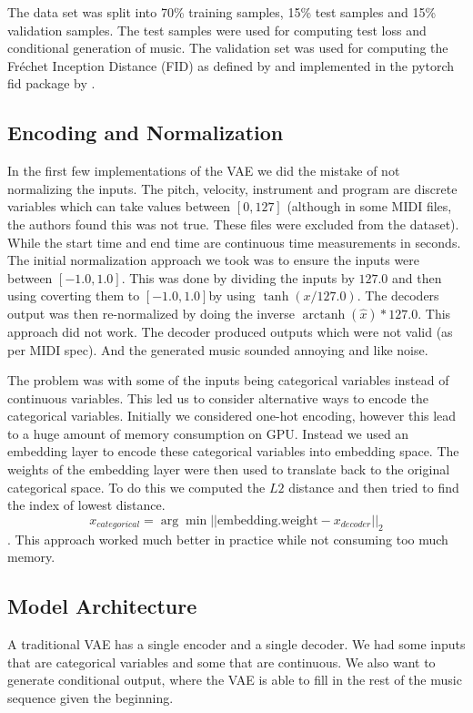 \documentclass{article}
\DeclareMathOperator\arctanh{arctanh}
\begin{document}
The data set was split into 70\% training samples, 15\% test samples and 15\% validation samples. The test samples were used for computing test loss and conditional generation of music. The validation set was used for computing the Fréchet Inception Distance (FID) as defined by \cite{heusel2018gans} and implemented in the pytorch fid package by \cite{Seitzer2020FID}.

\subsection{Encoding and Normalization}

In the first few implementations of the VAE we did the mistake of not normalizing the inputs. The pitch, velocity, instrument and program are discrete variables which can take values between $[0, 127]$ (although in some MIDI files, the authors found this was not true. These files were excluded from the dataset). While the start time and end time are continuous time measurements in seconds. The initial normalization approach we took was to ensure the inputs were between $[-1.0, 1.0]$. This was done by dividing the inputs by $127.0$ and then using coverting them to $[-1.0, 1.0]$by using $\tanh(x/127.0)$. The decoders output was then re-normalized by doing the inverse $\arctanh(\hat{x}) * 127.0$. This approach did not work. The decoder produced outputs which were not valid (as per MIDI spec). And the generated music sounded annoying and like noise.

The problem was with some of the inputs being categorical variables instead of continuous variables. This led us to consider alternative ways to encode the categorical variables. Initially we considered one-hot encoding, however this lead to a huge amount of memory consumption on GPU. Instead we used an embedding layer to encode these categorical variables into embedding space. The weights of the embedding layer were then used to translate back to the original categorical space. To do this we computed the $L2$ distance and then tried to find the index of lowest distance. $$ x_{categorical} = \arg \min || \mathrm{embedding.weight} - x_{decoder}||_2 $$. This approach worked much better in practice while not consuming too much memory.


\subsection{Model Architecture}

A traditional VAE has a single encoder and a single decoder. We had some inputs that are categorical variables and some that are continuous. We also want to generate conditional output, where the VAE is able to fill in the rest of the music sequence given the beginning. 
\end{document}
